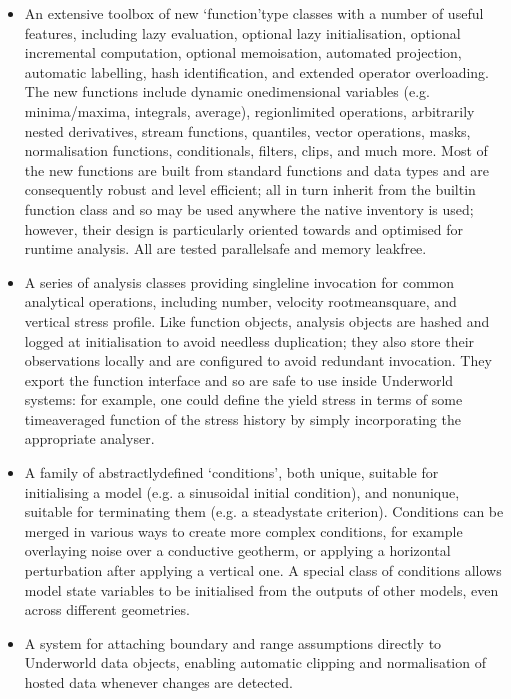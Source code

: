\documentclass[letterpaper,10pt,english]{jupyterBook}
\begin{document}
\begin{itemize}
\item {} 
\sphinxAtStartPar
An extensive toolbox of new  ‘function’\sphinxhyphen{}type classes with a number of useful features, including lazy evaluation, optional lazy initialisation, optional incremental computation, optional memoisation, automated projection, automatic labelling, hash identification, and extended operator overloading. The new functions include dynamic one\sphinxhyphen{}dimensional variables (e.g. minima/maxima, integrals, average), region\sphinxhyphen{}limited operations, arbitrarily nested derivatives, stream functions, quantiles, vector operations, masks, normalisation functions, conditionals, filters, clips, and much more. Most of the new functions are built from standard  functions and data types and are consequently robust and \sphinxhyphen{}level efficient; all in turn inherit from the built\sphinxhyphen{}in  function class and so may be used anywhere the native inventory is used; however, their design is particularly oriented towards and optimised for run\sphinxhyphen{}time analysis. All are tested parallel\sphinxhyphen{}safe and memory leak\sphinxhyphen{}free.

\item {} 
\sphinxAtStartPar
A series of analysis classes providing single\sphinxhyphen{}line invocation for common analytical operations, including  number, velocity root\sphinxhyphen{}mean\sphinxhyphen{}square, and vertical stress profile. Like  function objects, analysis objects are hashed and logged at initialisation to avoid needless duplication; they also store their observations locally and are configured to avoid redundant invocation. They export the  function interface and so are safe to use inside Underworld systems: for example, one could define the yield stress in terms of some time\sphinxhyphen{}averaged function of the stress history by simply incorporating the appropriate  analyser.

\item {} 
\sphinxAtStartPar
A family of abstractly\sphinxhyphen{}defined ‘conditions’, both unique, suitable for initialising a model (e.g. a sinusoidal initial condition), and non\sphinxhyphen{}unique, suitable for terminating them (e.g. a steady\sphinxhyphen{}state criterion). Conditions can be merged in various ways to create more complex conditions, for example overlaying noise over a conductive geotherm, or applying a horizontal perturbation after applying a vertical one. A special class of conditions allows model state variables to be initialised from the outputs of other models, even across different geometries.

\item {} 
\sphinxAtStartPar
A system for attaching boundary and range assumptions directly to Underworld data objects, enabling automatic clipping and normalisation of hosted data whenever changes are detected.

\end{itemize}
\end{document}
